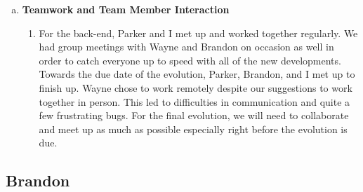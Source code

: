 \documentclass[11pt]{article}   %
\begin{document}
\begin{enumerate} [a)]
\begin{enumerate} [$\cdot$]
\end{enumerate}
\item  {\bf Teamwork and Team Member Interaction}
\begin{enumerate} [$\cdot$]
\item For the back-end, Parker and I met up and worked together regularly.  We had group meetings with Wayne and Brandon on occasion as well in order to catch everyone up to speed with all of the new developments.  Towards the due date of the evolution, Parker, Brandon, and I met up to finish up.  Wayne chose to work remotely despite our suggestions to work together in person.  This led to difficulties in communication and quite a few frustrating bugs. For the final evolution, we will need to collaborate and meet up as much as possible especially right before the evolution is due.
\end{enumerate}
\end{enumerate}

\subsection*{Brandon}
\end{document}
